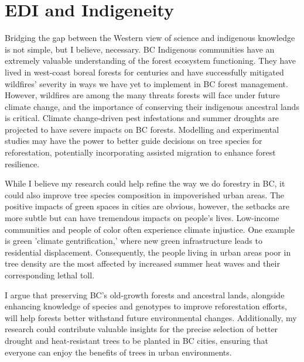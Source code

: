\documentclass[11pt,letter]{article}
\begin{document}
\section *{EDI and Indigeneity}
Bridging the gap between the Western view of science and indigenous knowledge is not simple, but I believe, necessary. BC Indigenous communities have an extremely valuable understanding of the forest ecosystem functioning. They have lived in west-coast boreal forests for centuries and have successfully mitigated wildfires' severity in ways we have yet to implement in BC forest management. However, wildfires are among the many threats forests will face under future climate change, and the importance of conserving their indigenous ancestral lands is critical. Climate change-driven pest infestations and summer droughts are projected to have severe impacts on BC forests. \citep{williams_climate_2002} Modelling and experimental studies may have the power to better guide decisions on tree species for reforestation, potentially incorporating assisted migration to enhance forest resilience. \citep{aitken_time_2016}

While I believe my research could help refine the way we do forestry in BC, it could also improve tree species composition in impoverished urban areas. The positive impacts of green spaces in cities are obvious, however, the setbacks are more subtle but can have tremendous impacts on people's lives. Low-income communities and people of color often experience climate injustice. One example is green 'climate gentrification,' where new green infrastructure leads to residential displacement. \citep{anguelovski_why_2019} Consequently, the people living in urban areas poor in tree density are the most affected by increased summer heat waves and their corresponding lethal toll. \citep{anguelovski_why_2019}

I argue that preserving BC's old-growth forests and ancestral lands, alongside enhancing knowledge of species and genotypes to improve reforestation efforts, will help forests better withstand future environmental changes. Additionally, my research could contribute valuable insights for the precise selection of better drought and heat-resistant trees to be planted in BC cities, ensuring that everyone can enjoy the benefits of trees in urban environments.
\end{document}
